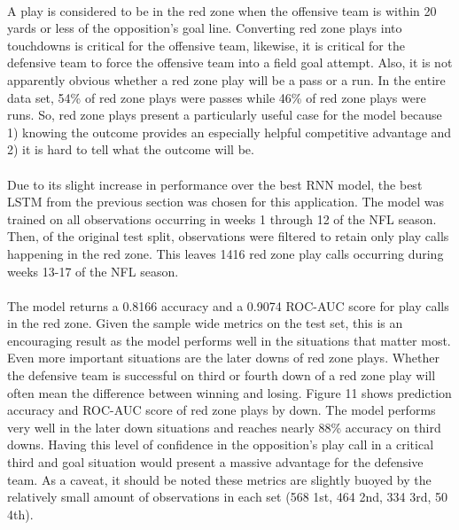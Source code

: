 \documentclass[11pt]{article}
\begin{document}
\begin{multicols*}{2}
            \paragraph{}
                A play is considered to be in the red zone when the offensive team is within 20 yards or less of the opposition's goal line. 
                Converting red zone plays into touchdowns is critical for the offensive team, likewise, it is critical for the defensive team to force the offensive team into a field goal attempt.
                Also, it is not apparently obvious whether a red zone play will be a pass or a run. 
                In the entire data set, 54\% of red zone plays were passes while 46\% of red zone plays were runs. 
                So, red zone plays present a particularly useful case for the model because 1) knowing the outcome provides an especially helpful competitive advantage and 2) it is hard to tell what the outcome will be.
                
            \vspace{-10pt}

            \paragraph{}
                Due to its slight increase in performance over the best RNN model, the best LSTM from the previous section was chosen for this application.
                The model was trained on all observations occurring in weeks 1 through 12 of the NFL season.
                Then, of the original test split, observations were filtered to retain only play calls happening in the red zone. 
                This leaves 1416 red zone play calls occurring during weeks 13-17 of the NFL season. 
            
            \vspace{-10pt}

            \paragraph{}
                The model returns a 0.8166 accuracy and a 0.9074 ROC-AUC score for play calls in the red zone. 
                Given the sample wide metrics on the test set, this is an encouraging result as the model performs well in the situations that matter most. 
                Even more important situations are the later downs of red zone plays. 
                Whether the defensive team is successful on third or fourth down of a red zone play will often mean the difference between winning and losing.
                Figure 11 shows prediction accuracy and ROC-AUC score of red zone plays by down. 
                The model performs very well in the later down situations and reaches nearly 88\% accuracy on third downs. 
                Having this level of confidence in the opposition's play call in a critical third and goal situation would present a massive advantage for the defensive team. 
                As a caveat, it should be noted these metrics are slightly buoyed by the relatively small amount of observations in each set (568 1st, 464 2nd, 334 3rd, 50 4th).   


            \end{multicols*}
\end{document}
